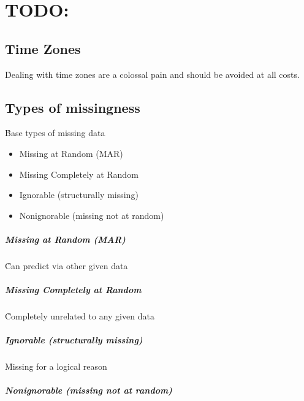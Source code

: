 \chapter{TODO:}


\section{Time Zones}

\r{Dealing with time zones are a colossal pain and should be avoided at all costs.}

\section{Types of missingness}


\r{Base types of missing data \cite{allison2001missing}}
\begin{itemize}[noitemsep,topsep=0pt]
	\item Missing at Random (MAR)
	\item Missing Completely at Random
	\item Ignorable (structurally missing)
	\item Nonignorable (missing not at random)
\end{itemize}

\paragraph{Missing at Random (MAR)}

\r{Can predict via other given data}

\paragraph{Missing Completely at Random}

\r{Completely unrelated to any given data}

\paragraph{ Ignorable (structurally missing)}

\r{Missing for a logical reason}

\paragraph{Nonignorable (missing not at random)}


